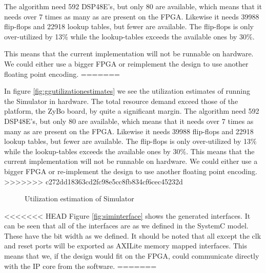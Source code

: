 The algorithm need 592 DSP48E's, but only 80 are available, which means that it needs over 7 times as many as are present on the FPGA. Likewise it needs 39988 flip-flops and 22918 lookup tables, but fewer are available. The flip-flops is only over-utilized by 13\% while the lookup-tables exceeds the available ones by 30\%. 

This means that the current implementation will not be runnable on hardware. We could either use a bigger FPGA or reimplement the design to use another floating point encoding.
=======

In figure \ref{fig:ggutilizationestimates} we see the utilization estimates of running the Simulator in hardware. The total resource demand exceed those of the platform, the ZyBo board, by quite a significant margin. The algorithm need 592 DSP48E's, but only 80 are available, which means that it needs over 7 times as many as are present on the FPGA. Likewise it needs 39988 flip-flops and 22918 lookup tables, but fewer are available. The flip-flops is only over-utilized by 13\% while the lookup-tables exceeds the available ones by 30\%. This means that the current implementation will not be runnable on hardware. We could either use a bigger FPGA or re-implement the design to use another floating point encoding.
>>>>>>> c272dd18363cd2fc98e5cc8fb834cf6cec45232d

\begin{figure}[h!]
	\centering
	\caption{Utilization estimation of Simulator}
	\label{fig:simutilizationestimates}
\end{figure}
<<<<<<< HEAD
Figure \ref{fig:siminterface} shows the generated interfaces. It can be seen that all of the interfaces are as we defined in the SystemC model. These have the bit width as we defined. It should be noted that all except the clk and reset ports will be exported as AXILite memory mapped interfaces. This means that we, if the design would fit on the FPGA, could communicate directly with the IP core from the software.
=======


